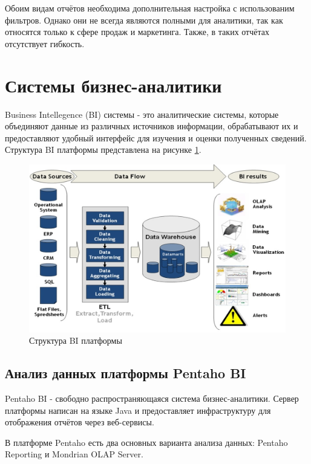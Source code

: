 Обоим видам отчётов необходима дополнительная настройка с использованим фильтров. Однако они не всегда являются полными для аналитики, так как относятся только к сфере продаж и маркетинга. Также, в таких отчётах отсутствует гибкость.

\nocite{vtiger}

\section{Системы бизнес-аналитики}

Business Intellegence (BI) системы - это аналитические системы, которые объединяют данные из различных источников информации, обрабатывают их и предоставляют удобный интерфейс для изучения и оценки полученных сведений.\cite{bi} Структура BI платформы представлена на рисунке \ref{fig:bi}.

\begin{figure}[htbp]
	\centering
	\includegraphics[width=.75\textwidth]{fig/chapter_1/bi}
	\caption{Структура BI платформы}
	\label{fig:bi}
\end{figure}

\subsection{Анализ данных платформы Pentaho BI}

Pentaho BI - свободно распространяющаяся система бизнес-аналитики. Сервер платформы написан на языке Java и предоставляет инфраструктуру для отображения отчётов через веб-сервисы. 

В платформе Pentaho есть два основных варианта анализа данных: Pentaho Reporting и Mondrian OLAP Server.

